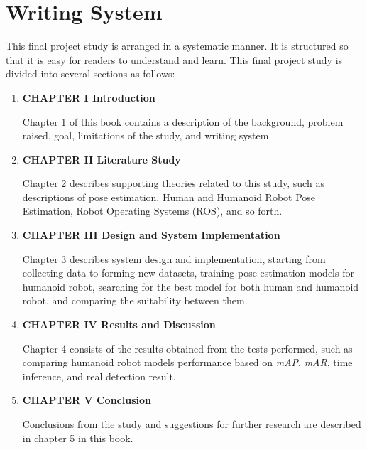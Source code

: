 \section{Writing System}
\label{sec:writingsystem}

This final project study is arranged in a systematic manner.
It is structured so that it is easy for readers to understand and learn.
This final project study is divided into several sections as follows:

\begin{enumerate}[nolistsep]

  \item \textbf{CHAPTER I Introduction}

        Chapter 1 of this book contains a description of the background, problem raised, goal, limitations of the study, and writing system.

        \vspace{2ex}

  \item \textbf{CHAPTER II Literature Study}

        Chapter 2 describes supporting theories related to this study, such as descriptions of pose estimation, Human and Humanoid Robot Pose Estimation, Robot Operating Systems (ROS), and so forth.

        \vspace{2ex}

  \item \textbf{CHAPTER III Design and System Implementation}

        Chapter 3 describes system design and implementation, starting from collecting data to forming new datasets, training pose estimation models for humanoid robot,
        searching for the best model for both human and humanoid robot, and comparing the suitability between them.

        \vspace{2ex}

  \item \textbf{CHAPTER IV Results and Discussion}

        Chapter 4 consists of the results obtained from the tests performed, such as comparing humanoid robot models performance based on \emph{mAP}, \emph{mAR}, time inference,
        and real detection result.

        \vspace{2ex}

  \item \textbf{CHAPTER V Conclusion}

        Conclusions from the study and suggestions for further research are described in chapter 5 in this book.

\end{enumerate}
